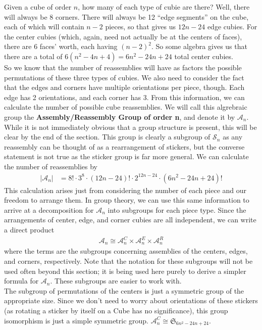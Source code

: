 \documentclass[10pt,letterpaper]{report}
\begin{document}
Given a cube of order $n$, how many of each type of cubie are there?  Well, there will always be 8 corners.  There will always be 12 ``edge segments'' on the cube, each of which will contain $n-2$ pieces, so that gives us $12n - 24$ edge cubies.  For the center cubies (which, again, need not actually be at the centers of faces), there are 6 faces' worth, each having $(n-2)^2$.  So some algebra gives us that there are a total of $6(n^2  - 4n + 4) = 6n^2 - 24n + 24$ total center cubies. \\

So we know that the number of reassemblies will have as factors the possible permutations of these three types of cubies.  We also need to consider the fact that the edges and corners have multiple orientations per piece, though.  Each edge has 2 orientations, and each corner has 3.  From this information, we can calculate the number of possible cube reassemblies.  We will call this algrebraic group the \textbf{Assembly/Reassembly Group of order n}, and denote it by $\mathcal{A}_n$.  While it is not immediately obvious that a group structure is present, this will be clear by the end of the section.  This group is clearly a subgroup of $\mathcal{S}_n$ as any reassembly can be thought of as a rearrangement of stickers, but the converse statement is not true as the sticker group is far more general.  We can calculate the number of reassemblies by \begin{align*}
|\mathcal{A}_n| &= 8! \cdot 3^8 \cdot (12n-24)! \cdot 2^{12n-24} \cdot (6n^2 - 24n + 24)!
\end{align*}
This calculation arises just from considering the number of each piece and our freedom to arrange them.  In group theory, we can use this same information to arrive at a decomposition for $\mathcal{A}_n$ into subgroups for each piece type.  Since the arrangements of center, edge, and corner cubies are all independent, we can write a direct product
\begin{align*}
\mathcal{A}_n \cong
\mathcal{A}_n^C \times
\mathcal{A}_n^E \times
\mathcal{A}_n^R
\end{align*}
where the terms are the subgroups concerning assemblies of the centers, edges, and corners, respectively.  Note that the notation for these subgroups will not be used often beyond this section; it is being used here purely to derive a simpler formula for $\mathcal{A}_n$.  These subgroups are easier to work with. \\

The subgroup of permutations of the centers is just a symmetric group of the appropriate size.  Since we don't need to worry about orientations of these stickers (as rotating a sticker by itself on a Cube has no significance), this group isomorphism is just a simple symmetric group. $ \mathcal{A}_n^C \cong \mathfrak{S}_{6n^2 - 24n + 24}$. \\
\end{document}
